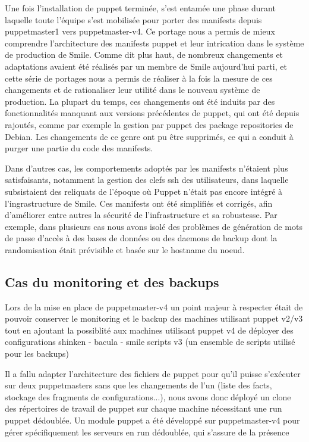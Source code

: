 \documentclass[14 pt,a4paper]{extreport}
\begin{document}
Une fois l'installation de puppet terminée, s'est entamée une phase durant laquelle toute l'équipe s'est mobilisée pour porter des manifests depuis puppetmaster1 vers puppetmaster-v4. Ce portage nous a permis de mieux comprendre l'architecture des manifests puppet et leur intrication dans le système de production de Smile. Comme dit plus haut, de nombreux changements et adaptations avaient été réalisés par un membre de Smile aujourd'hui parti, et cette série de portages nous a permis de réaliser à la fois la mesure de ces changements et de rationaliser leur utilité dans le nouveau système de production. La plupart du temps, ces changements ont été induits par des fonctionnalités manquant aux versions précédentes de puppet, qui ont été depuis rajoutés, comme par exemple la gestion par puppet des package repositories de Debian. Les changements de ce genre ont pu être supprimés, ce qui a conduit à purger une partie du code des manifests.

Dans d'autres cas, les comportements adoptés par les manifests n'étaient plus satisfaisants, notamment la gestion des clefs ssh des utilisateurs, dans laquelle subsistaient des reliquats de l'époque où Puppet n'était pas encore intégré à l'ingrastructure de Smile. Ces manifests ont été simplifiés et corrigés, afin d'améliorer entre autres la sécurité de l'infrastructure et sa robustesse. Par exemple, dans plusieurs cas nous avons isolé des problèmes de génération de mots de passe d'accès à des bases de données ou des daemons de backup dont la randomisation était prévisible et basée sur le hostname du noeud.

\subsection{Cas du monitoring et des backups}

Lors de la mise en place de puppetmaster-v4 un point majeur à respecter était de pouvoir conserver le monitoring et le backup des machines utilisant puppet v2/v3 tout en ajoutant la possiblité aux machines utilisant puppet v4 de déployer des configurations shinken - bacula - smile scripts v3 (un ensemble de scripts utilisé pour les backups)

Il a fallu adapter l'architecture des fichiers de puppet pour qu'il puisse s'exécuter sur deux puppetmasters sans que les changements de l'un (liste des facts, stockage des fragments de configurations...), nous avons donc déployé un clone des répertoires de travail de puppet sur chaque machine nécessitant une run puppet dédoublée. Un module puppet a été développé sur puppetmaster-v4 pour gérer spécifiquement les serveurs en run dédoublée, qui s'assure de la présence 
\end{document}
